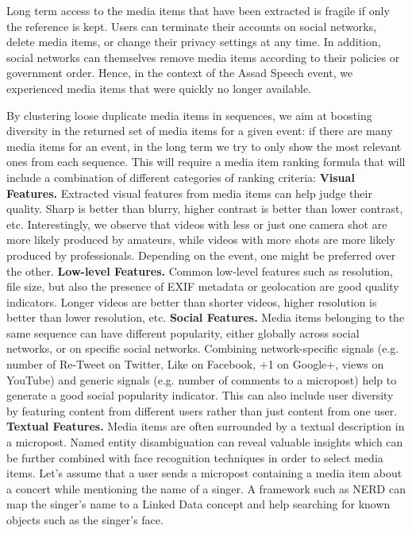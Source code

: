 \documentclass{acm_proc_article-sp}
\begin{document}
Long term access to the media items that have been extracted is fragile if only the reference is kept. Users can terminate their accounts on social networks,
delete media items, or change their privacy settings at any time. In addition, social networks can themselves remove media items according to their policies or government order. Hence, in the context of the Assad Speech event, we experienced media items that were quickly no longer available.

By clustering loose duplicate media items in sequences, we aim at boosting diversity in the returned set of media items for a given event: if there are many media items for an event, in the long term we try to only show the most relevant ones from each sequence. This will require a media item ranking formula that will include a combination of different categories of ranking criteria:
\newline
\textbf{Visual Features.} Extracted visual features from media items can help judge their quality. Sharp is better than blurry, higher contrast is better than lower contrast, etc. Interestingly, we observe that videos with less or just one camera shot are more likely produced by amateurs, while videos with more shots are more likely produced by professionals. Depending on the event, one might be preferred over the other.
\newline
\textbf{Low-level Features.} Common low-level features such as resolution, file size, but also the presence of EXIF metadata or geolocation are good quality indicators. Longer videos are better than shorter videos, higher resolution is better than lower resolution, etc.
\newline
\textbf{Social Features.} Media items belonging to the same sequence can have different popularity, either globally across social networks, or on specific social networks. Combining network-specific signals (e.g. number of Re-Tweet on Twitter, Like on Facebook, +1 on Google+, views on YouTube) and generic signals (e.g. number of comments to a micropost) help to generate a good social popularity indicator. This can also include user diversity by featuring content from different users rather than just content from one user.
\newline
\textbf{Textual Features.} Media items are often surrounded by a textual description in a micropost. Named entity disambiguation can reveal valuable insights which can be further combined with face recognition techniques in order to select media items. Let's assume that a user sends a micropost containing a media item about a concert while mentioning the name of a singer. A framework such as NERD can map the singer's name to a Linked Data concept and help searching for known objects such as the singer's face.
\end{document}
